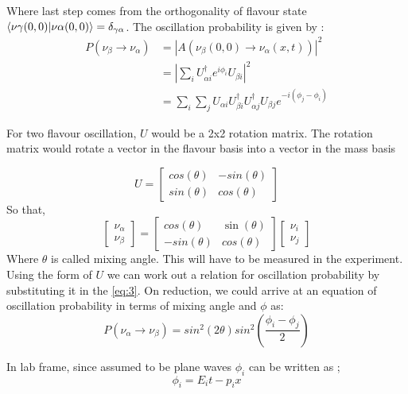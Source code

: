 \documentclass[12pt,a4paper]{report}
\begin{document}
Where last step comes from the orthogonality of flavour state $\braket{\nu\gamma(0,0)|\nu\alpha(0,0)} =\delta_{\gamma\alpha}$. 
The oscillation probability is given by :
\begin{equation}
\label{eq:3}
\begin{split}
P(\nu_{\beta} \rightarrow\nu_{\alpha})& =|A(\nu_{\beta}(0,0)\rightarrow\nu_{\alpha}(x,t))|^{2}\\
&=|\sum_{i}U_{\alpha i}^{\dagger} e^{i\phi_{i}}U_{\beta i}|^{2}\\
&=\sum_{i}\sum_{j}U_{\alpha i} U_{\beta i}^{\dagger} U_{\alpha j }^{\dagger}U_{\beta j}e^{-i(\phi_{j}-\phi_{i})}
\end{split}
\end{equation}

For two flavour oscillation, $U$ would be a 2x2 rotation matrix. The rotation matrix would rotate a vector in the flavour basis into a vector in the mass basis

\begin{equation}
U= \begin{bmatrix}cos(\theta) & -sin(\theta) \\ sin(\theta) & cos(\theta) \end{bmatrix}	
\end{equation}
So that,
\begin{equation}
\begin{bmatrix} \nu_{\alpha} \\ \nu_{\beta} \end{bmatrix} = \begin{bmatrix} cos(\theta) & \sin(\theta) \\ -sin(\theta) & cos(\theta) \end{bmatrix}\begin{bmatrix} \nu_{i} \\ \nu_{j} 
\end{bmatrix}
\end{equation}
Where $\theta$ is called mixing angle. This will have to be measured in the experiment. 
Using the form of $U$ we can work out a relation for oscillation probability by substituting it in the \ref{eq:3}. On reduction, we could arrive at an equation of oscillation probability in terms of mixing angle and $\phi$ as:
\begin{equation}
\label{eq:3a}
P(\nu_{\alpha} \rightarrow \nu_{\beta}) = sin^{2}(2\theta)sin^{2}(\frac{\phi_{i}-\phi_{j}}{2})
\end{equation}

In lab frame, since assumed to be plane waves $\phi_{i}$ can be written as ;
\begin{equation}
\phi_{i} = E_{i} t - p_{i}x
\end{equation}
\end{document}
